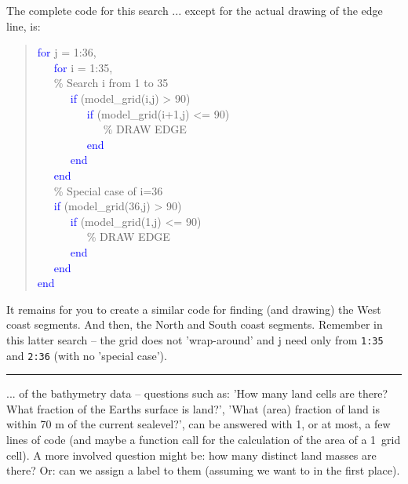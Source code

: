 \documentclass{tufte-book} %
\newenvironment{docspec}{\begin{quotation}\ttfamily\parskip0pt\parindent0pt\ignorespaces}{\end{quotation}}
\begin{document}
The complete code for this search ... except for the actual drawing of the edge line, is: 
\begin{docspec}
\textcolor{blue}{for} j = 1:36,\\
\ \ \ \textcolor{blue}{for} i = 1:35,\\
\ \ \ \textcolor[rgb]{0,0.501961,0}{\% Search i from 1 to 35}\\
\ \ \ \ \ \ \textcolor{blue}{if} (model\_grid(i,j) > 90)\\
\ \ \ \ \ \ \ \ \ \textcolor{blue}{if} (model\_grid(i+1,j) <= 90)\\
\ \ \ \ \ \ \ \ \ \ \ \ \textcolor[rgb]{0,0.501961,0}{\% DRAW EDGE}\\
\ \ \ \ \ \ \ \ \ \textcolor{blue}{end}\\
\ \ \ \ \ \ \textcolor{blue}{end}\\
\ \ \ \textcolor{blue}{end}\\
\ \ \ \textcolor[rgb]{0,0.501961,0}{\% Special case of i=36}\\
\ \ \ \textcolor{blue}{if} (model\_grid(36,j) > 90)\\
\ \ \ \ \ \ \textcolor{blue}{if} (model\_grid(1,j) <= 90)\\
\ \ \ \ \ \ \ \ \ \textcolor[rgb]{0,0.501961,0}{\% DRAW EDGE}\\
\ \ \ \ \ \ \textcolor{blue}{end}\\
\ \ \ \textcolor{blue}{end}\\
\textcolor{blue}{end}
\end{docspec}

It remains for you to create a similar code for finding (and drawing) the West coast segments. And then, the North and South coast segments. Remember in this latter search -- the grid does not 'wrap-around' and j need only from \texttt{1:35} and \texttt{2:36} (with no 'special case').

\vspace{1mm}
\noindent\rule{4cm}{0.5pt}
\vspace{-2mm}

 ... of the bathymetry data -- questions such as: 'How many land cells are there?  What fraction of the Earths surface is land?', 'What (area) fraction of land is within 70 m of the current sealevel?', can be answered with 1, or at most, a few lines of code (and maybe a function call for the calculation of the area of a 1\degree\ grid cell). A more involved question might be: how many distinct land masses are there? Or: can we assign a label to them (assuming we want to in the first place).
\end{document}
